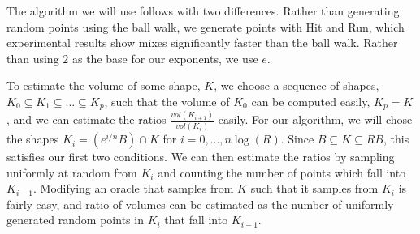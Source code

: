 The algorithm we will use follows %
with two differences. Rather than generating random points using the ball walk, we generate points with Hit and Run, which experimental results show mixes significantly faster than the ball walk. Rather than using $2$ as the base for our exponents, we use $e$.

To estimate the volume of some shape, $K$, we choose a sequence of shapes, $K_0 \subseteq K_1 \subseteq ... \subseteq K_p$, such that the volume of $K_0$ can be computed easily, $K_p = K$, and we can estimate the ratios $\frac{vol(K_{i+1})}{vol(K_i)}$ easily. For our algorithm, we will chose the shapes $K_i = (e^{i/n}B) \cap K$ for $i = 0, ..., n \log (R)$. Since $B \subseteq K \subseteq RB$, this satisfies our first two conditions. We can then estimate the ratios by sampling uniformly at random from $K_i$ and counting the number of points which fall into $K_{i-1}$. Modifying an oracle that samples from $K$ such that it samples from $K_i$ is fairly easy, and ratio of volumes can be estimated as the number of uniformly generated random points in $K_i$ that fall into $K_{i-1}$.